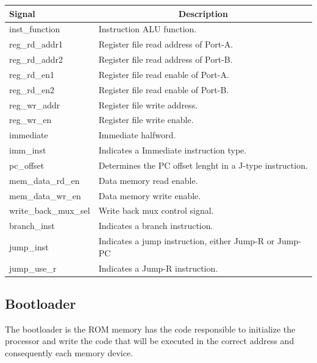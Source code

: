 \documentclass{article}
\begin{document}
  \begin{table}[htbp]
    \begin{center}
      \begin{tabular}{|l|l|}
        \hline
        \cellcolor[gray]{0.9}\textbf{Signal} & \multicolumn{1}{c|}{\cellcolor[gray]{0.9}\textbf{Description}} \\ \hline
        inst\_function & Instruction ALU function. \\ \hline
        reg\_rd\_addr1 & Register file read address of Port-A. \\ \hline
        reg\_rd\_addr2 & Register file read address of Port-B. \\ \hline
        reg\_rd\_en1 & Register file read enable of Port-A. \\ \hline
        reg\_rd\_en2 & Register file read enable of Port-B. \\ \hline
        reg\_wr\_addr & Register file write address. \\ \hline
        reg\_wr\_en & Register file write enable. \\ \hline
        immediate & Immediate halfword. \\ \hline
        imm\_inst & Indicates a Immediate instruction type. \\ \hline
        pc\_offset & Determines the PC offset lenght in a J-type instruction. \\ \hline
        mem\_data\_rd\_en & Data memory read enable. \\ \hline
        mem\_data\_wr\_en & Data memory write enable. \\ \hline
        write\_back\_mux\_sel & Write back mux control signal. \\ \hline
        branch\_inst & Indicates a branch instruction. \\ \hline
        jump\_inst & Indicates a jump instruction, either Jump-R or Jump-PC \\ \hline
        jump\_use\_r & Indicates a Jump-R instruction. \\ \hline
        \end{tabular}
    \end{center}
  \end{table}  
  
  \newpage
  \subsection{Bootloader}
  The bootloader is the ROM memory has the code responsible to initialize the processor and write the code that will be executed in the correct address and consequently each memory device.
\end{document}
